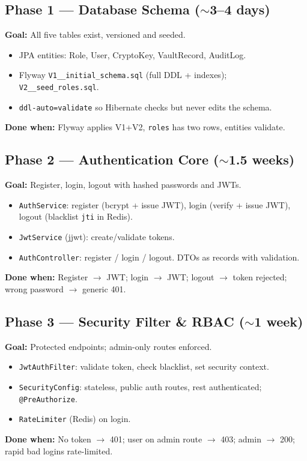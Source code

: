 \documentclass[11pt,a4paper]{article}
\newcommand{\code}[1]{\texttt{#1}}
\begin{document}
\subsection{Phase 1 — Database Schema ($\sim$3–4 days)}
\textbf{Goal:} All five tables exist, versioned and seeded.
\begin{itemize}[leftmargin=*]
  \item JPA entities: Role, User, CryptoKey, VaultRecord, AuditLog.
  \item Flyway \code{V1\_\_initial\_schema.sql} (full DDL + indexes); \code{V2\_\_seed\_roles.sql}.
  \item \code{ddl-auto=validate} so Hibernate checks but never edits the schema.
\end{itemize}
\textbf{Done when:} Flyway applies V1+V2, \code{roles} has two rows, entities validate.

\subsection{Phase 2 — Authentication Core ($\sim$1.5 weeks)}
\textbf{Goal:} Register, login, logout with hashed passwords and JWTs.
\begin{itemize}[leftmargin=*]
  \item \code{AuthService}: register (bcrypt + issue JWT), login (verify + issue JWT), logout (blacklist \code{jti} in Redis).
  \item \code{JwtService} (jjwt): create/validate tokens.
  \item \code{AuthController}: register / login / logout. DTOs as records with validation.
\end{itemize}
\textbf{Done when:} Register $\to$ JWT; login $\to$ JWT; logout $\to$ token rejected; wrong password $\to$ generic 401.

\subsection{Phase 3 — Security Filter \& RBAC ($\sim$1 week)}
\textbf{Goal:} Protected endpoints; admin-only routes enforced.
\begin{itemize}[leftmargin=*]
  \item \code{JwtAuthFilter}: validate token, check blacklist, set security context.
  \item \code{SecurityConfig}: stateless, public auth routes, rest authenticated; \code{@PreAuthorize}.
  \item \code{RateLimiter} (Redis) on login.
\end{itemize}
\textbf{Done when:} No token $\to$ 401; user on admin route $\to$ 403; admin $\to$ 200; rapid bad logins rate-limited.
\end{document}

